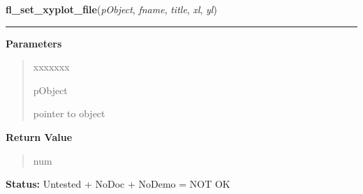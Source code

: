 \hspace{.8\funcindent}\begin{boxedminipage}{\funcwidth}

    \raggedright \textbf{fl\_set\_xyplot\_file}(\textit{pObject}, \textit{fname}, \textit{title}, \textit{xl}, \textit{yl})

    \vspace{-1.5ex}

    \rule{\textwidth}{0.5\fboxrule}
\setlength{\parskip}{2ex}
\setlength{\parskip}{1ex}
      \textbf{Parameters}
      \vspace{-1ex}

      \begin{quote}
        \begin{Ventry}{xxxxxxx}

          \item[pObject]

          pointer to object

        \end{Ventry}

      \end{quote}

      \textbf{Return Value}
    \vspace{-1ex}

      \begin{quote}
      num

      \end{quote}

\textbf{Status:} Untested + NoDoc + NoDemo = NOT OK



    \end{boxedminipage}

    \label{xformslib:library:fl_insert_xyplot_data}

    \vspace{0.5ex}

